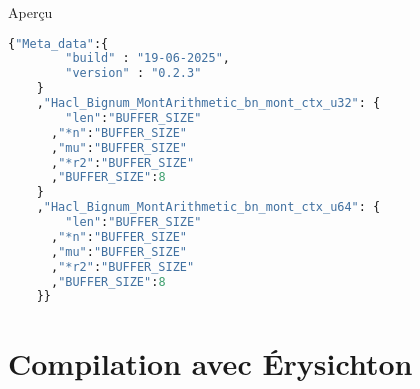 \documentclass[A4,svgnames,9pt,aspectratio=169]{beamer}
\begin{document}

\begin{frame}[fragile]{Aperçu}
  \begin{lstlisting}[style=CStyle, language=Python, gobble=4, caption={Hacl\_Bignum.json}]
    {"Meta_data":{
        "build" : "19-06-2025",
        "version" : "0.2.3"
    }
    ,"Hacl_Bignum_MontArithmetic_bn_mont_ctx_u32": {
        "len":"BUFFER_SIZE"
      ,"*n":"BUFFER_SIZE"
      ,"mu":"BUFFER_SIZE"
      ,"*r2":"BUFFER_SIZE"
      ,"BUFFER_SIZE":8
    }
    ,"Hacl_Bignum_MontArithmetic_bn_mont_ctx_u64": {
        "len":"BUFFER_SIZE"
      ,"*n":"BUFFER_SIZE"
      ,"mu":"BUFFER_SIZE"
      ,"*r2":"BUFFER_SIZE"
      ,"BUFFER_SIZE":8
    }}
  \end{lstlisting}
\end{frame}


\section{Compilation avec Érysichton}
\frame{\sectionpage}
\end{document}
